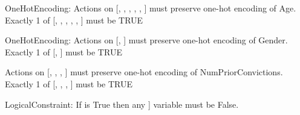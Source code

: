 \begin{constraints}
\item OneHotEncoding: Actions on [, , , , , ] must preserve one-hot encoding of Age. Exactly 1 of [, , , , , ] must be TRUE
\item OneHotEncoding: Actions on [, ] must preserve one-hot encoding of Gender. Exactly 1 of [, ] must be TRUE
\item Actions on [, , , ] must preserve one-hot encoding of NumPriorConvictions. Exactly 1 of [, , , ] must be TRUE
\item LogicalConstraint: If  is True then any ] variable must be False.
\end{constraints}